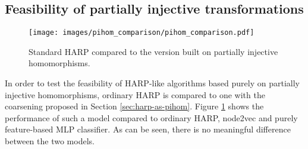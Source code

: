 \subsection{Feasibility of partially injective transformations}\label{sec:harp-vs-pihom}

\begin{figure}
  \centering
  \texttt{[image: images/pihom\_comparison/pihom\_comparison.pdf]}
  \caption{Standard HARP compared to the version built on partially injective homomorphisms.}
  \label{fig:HARP-vs-PIHom}
\end{figure}

In order to test the feasibility of HARP-like algorithms based purely on partially injective homomorphisms, ordinary HARP is compared to one with the coarsening proposed in Section \ref{sec:harp-as-pihom}. Figure \ref{fig:HARP-vs-PIHom} shows the performance of such a model compared to ordinary HARP, node2vec and purely feature-based MLP classifier. As can be seen, there is no meaningful difference between the two models.
